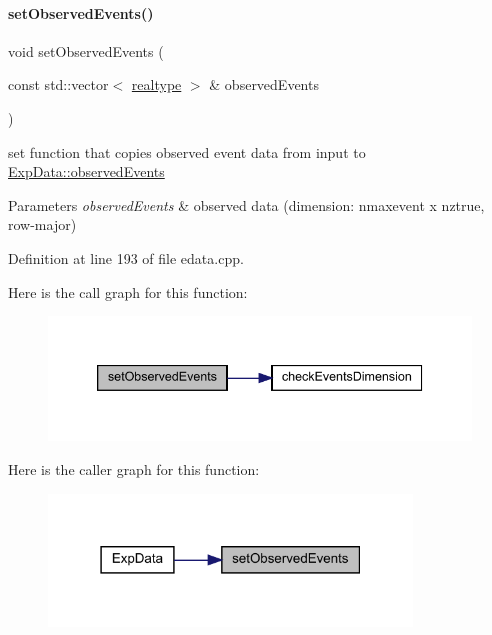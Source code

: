 \paragraph{\texorpdfstring{setObservedEvents()}{setObservedEvents()}\hspace{0.1cm}{\footnotesize\ttfamily [1/2]}}
{\footnotesize\ttfamily void set\+Observed\+Events (\begin{DoxyParamCaption}\item[{const std\+::vector$<$ \mbox{\hyperlink{namespaceamici_a1bdce28051d6a53868f7ccbf5f2c14a3}{realtype}} $>$ \&}]{observed\+Events }\end{DoxyParamCaption})}

set function that copies observed event data from input to \mbox{\hyperlink{classamici_1_1_exp_data_a629e6085839e16bac95ef0eba580f7f0}{Exp\+Data\+::observed\+Events}}


\begin{DoxyParams}{Parameters}
{\em observed\+Events} & observed data (dimension\+: nmaxevent x nztrue, row-\/major) \\
\hline
\end{DoxyParams}


Definition at line 193 of file edata.\+cpp.

Here is the call graph for this function\+:
\nopagebreak
\begin{figure}[H]
\begin{center}
\leavevmode
\includegraphics[width=339pt]{classamici_1_1_exp_data_ae621c2d67f85f390d01a97658c956098_cgraph}
\end{center}
\end{figure}
Here is the caller graph for this function\+:
\nopagebreak
\begin{figure}[H]
\begin{center}
\leavevmode
\includegraphics[width=274pt]{classamici_1_1_exp_data_ae621c2d67f85f390d01a97658c956098_icgraph}
\end{center}
\end{figure}
\mbox{\label{classamici_1_1_exp_data_a22ae335c4988600623e7a0c5ca7b47aa}} 
